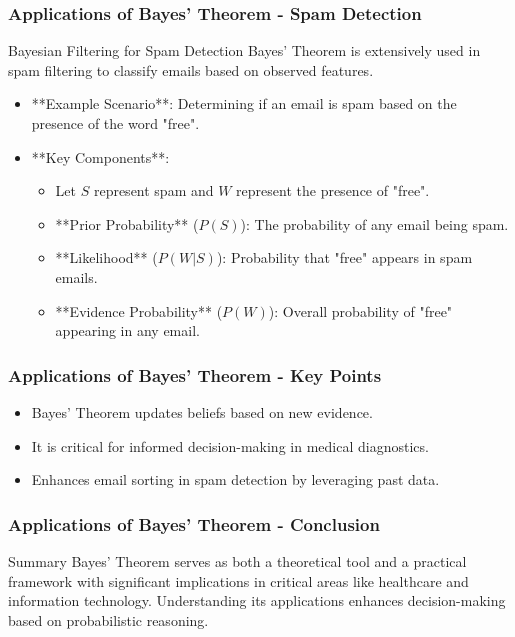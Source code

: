 \documentclass[aspectratio=169]{beamer}
\begin{document}
\begin{frame}[fragile]
    \frametitle{Applications of Bayes' Theorem - Spam Detection}
    \begin{block}{Bayesian Filtering for Spam Detection}
        Bayes' Theorem is extensively used in spam filtering to classify emails based on observed features.
    \end{block}
    \begin{itemize}
        \item **Example Scenario**: Determining if an email is spam based on the presence of the word "free".
        \item **Key Components**:
            \begin{itemize}
                \item Let \(S\) represent spam and \(W\) represent the presence of "free".
                \item **Prior Probability** (\(P(S)\)): The probability of any email being spam.
                \item **Likelihood** (\(P(W|S)\)): Probability that "free" appears in spam emails.
                \item **Evidence Probability** (\(P(W)\)): Overall probability of "free" appearing in any email.
            \end{itemize}
    \end{itemize}
\end{frame}

\begin{frame}[fragile]
    \frametitle{Applications of Bayes' Theorem - Key Points}
    \begin{itemize}
        \item Bayes' Theorem updates beliefs based on new evidence.
        \item It is critical for informed decision-making in medical diagnostics.
        \item Enhances email sorting in spam detection by leveraging past data.
    \end{itemize}
\end{frame}

\begin{frame}[fragile]
    \frametitle{Applications of Bayes' Theorem - Conclusion}
    \begin{block}{Summary}
        Bayes' Theorem serves as both a theoretical tool and a practical framework with significant implications in critical areas like healthcare and information technology. Understanding its applications enhances decision-making based on probabilistic reasoning.
    \end{block}
\end{frame}
\end{document}
